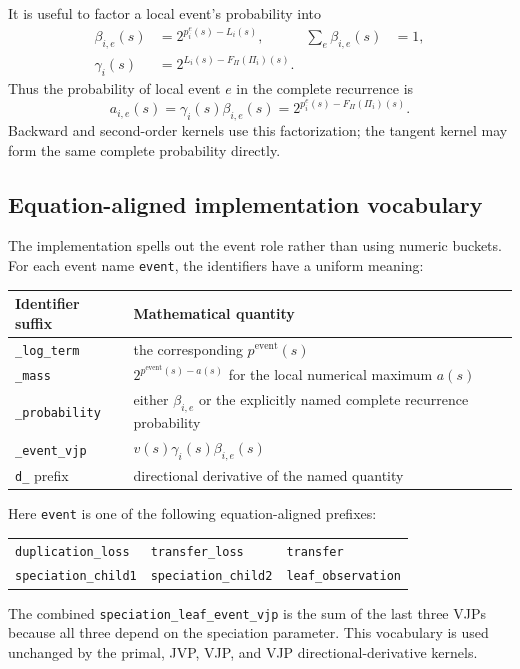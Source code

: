 \documentclass[11pt]{article}
\begin{document}
It is useful to factor a local event's probability into
\begin{align}
  \beta_{i,e}(s)&=2^{p^e_i(s)-L_i(s)},
    &\sum_e\beta_{i,e}(s)&=1,\\
  \gamma_i(s)&=2^{L_i(s)-F_\Pi(\Pi_i)(s)}.
  \label{eq:within-wave-probability}
\end{align}
Thus the probability of local event $e$ in the complete recurrence is
\begin{equation}
  a_{i,e}(s)=\gamma_i(s)\beta_{i,e}(s)
  =2^{p^e_i(s)-F_\Pi(\Pi_i)(s)}.
  \label{eq:complete-local-event-probability}
\end{equation}
Backward and second-order kernels use this factorization; the tangent kernel
may form the same complete probability directly.

\subsection{Equation-aligned implementation vocabulary}

The implementation spells out the event role rather than using numeric
buckets.  For each event name \texttt{event}, the identifiers have a uniform
meaning:
\begin{center}
\begin{tabular}{ll}
\toprule
Identifier suffix & Mathematical quantity \\
\midrule
\texttt{\_log\_term} & the corresponding $p^{\mathrm{event}}(s)$ \\
\texttt{\_mass} & $2^{p^{\mathrm{event}}(s)-a(s)}$ for the local numerical maximum $a(s)$ \\
\texttt{\_probability} & either $\beta_{i,e}$ or the explicitly named complete recurrence probability \\
\texttt{\_event\_vjp} & $v(s)\gamma_i(s)\beta_{i,e}(s)$ \\
\texttt{d\_} prefix & directional derivative of the named quantity \\
\bottomrule
\end{tabular}
\end{center}
Here \texttt{event} is one of the following equation-aligned prefixes:
\begin{center}
\begin{tabular}{lll}
\texttt{duplication\_loss} & \texttt{transfer\_loss} & \texttt{transfer} \\
\texttt{speciation\_child1} & \texttt{speciation\_child2} & \texttt{leaf\_observation}
\end{tabular}
\end{center}
The combined
\texttt{speciation\_leaf\_event\_vjp} is the sum of the last three VJPs
because all three depend on the speciation parameter.  This vocabulary is
used unchanged by the primal, JVP, VJP, and VJP directional-derivative
kernels.
\end{document}

